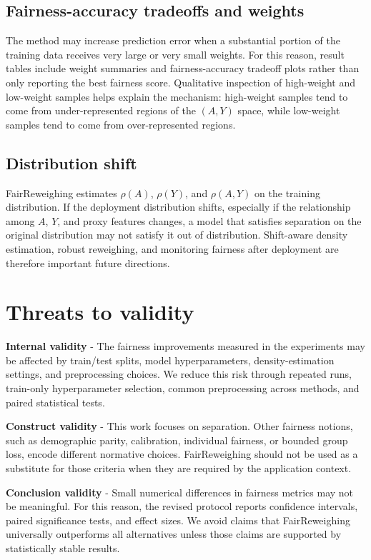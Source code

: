 \subsection{Fairness-accuracy tradeoffs and weights}
The method may increase prediction error when a substantial portion of the training data receives very large or very small weights. For this reason, result tables include weight summaries and fairness-accuracy tradeoff plots rather than only reporting the best fairness score. Qualitative inspection of high-weight and low-weight samples helps explain the mechanism: high-weight samples tend to come from under-represented regions of the $(A,Y)$ space, while low-weight samples tend to come from over-represented regions.

\subsection{Distribution shift}
FairReweighing estimates $\rho(A)$, $\rho(Y)$, and $\rho(A,Y)$ on the training distribution. If the deployment distribution shifts, especially if the relationship among $A$, $Y$, and proxy features changes, a model that satisfies separation on the original distribution may not satisfy it out of distribution. Shift-aware density estimation, robust reweighing, and monitoring fairness after deployment are therefore important future directions.


\section{Threats to validity}
\label{threats}


\noindent\textbf{Internal validity} - The fairness improvements measured in the experiments may be affected by train/test splits, model hyperparameters, density-estimation settings, and preprocessing choices. We reduce this risk through repeated runs, train-only hyperparameter selection, common preprocessing across methods, and paired statistical tests.

\noindent\textbf{Construct validity} - This work focuses on separation. Other fairness notions, such as demographic parity, calibration, individual fairness, or bounded group loss, encode different normative choices. FairReweighing should not be used as a substitute for those criteria when they are required by the application context.

\noindent\textbf{Conclusion validity} - Small numerical differences in fairness metrics may not be meaningful. For this reason, the revised protocol reports confidence intervals, paired significance tests, and effect sizes. We avoid claims that FairReweighing universally outperforms all alternatives unless those claims are supported by statistically stable results.

